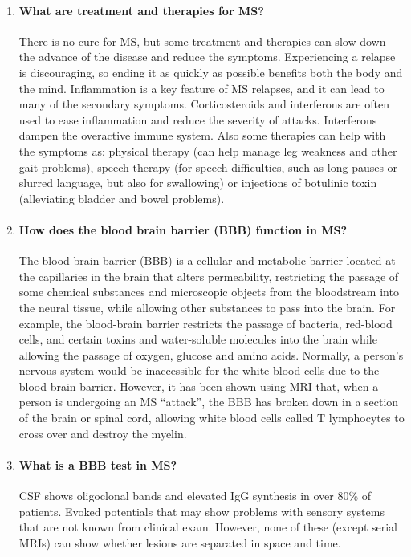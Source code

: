 \documentclass[12pt,article,oneside,a4paper]{memoir}
\begin{document}
\begin{enumerate}
\item \paragraph{What are treatment and therapies for MS?}
There is no cure for MS, but some treatment and therapies can slow down the
advance of the disease and reduce the symptoms.
Experiencing a relapse is discouraging, so ending it as quickly as possible
benefits both the body and the mind. Inflammation is a key feature of MS
relapses, and it can lead to many of the secondary symptoms. Corticosteroids
and interferons are often used to ease inflammation and reduce the severity of
attacks. Interferons dampen the overactive immune system. Also some therapies
can help with the symptoms as: physical therapy (can help manage leg weakness
and other gait problems), speech therapy (for speech difficulties, such as long
pauses or slurred language, but also for swallowing) or injections of botulinic
toxin (alleviating bladder and bowel problems).

\item \paragraph{How does the blood brain barrier (BBB) function in MS?}
The blood-brain barrier (BBB) is a cellular and metabolic barrier located at
the capillaries in the brain that alters permeability, restricting the passage
of some chemical substances and microscopic objects from the bloodstream into
the neural tissue, while allowing other substances to pass into the brain. For
example, the blood-brain barrier restricts the passage of bacteria, red-blood
cells, and certain toxins and water-soluble molecules into the brain while
allowing the passage of oxygen, glucose and amino acids. Normally, a person's
nervous system would be inaccessible for the white blood cells due to the
blood-brain barrier. However, it has been shown using MRI that, when a person
is undergoing an MS ``attack'', the BBB has broken down in a section of the
brain or spinal cord, allowing white blood cells called T lymphocytes to cross
over and destroy the myelin. 

\item \paragraph{What is a BBB test in MS?}
CSF shows oligoclonal bands and elevated IgG synthesis in over 80\% of patients.
Evoked potentials that may show problems with sensory systems that are not
known from clinical exam. However, none of these (except serial MRIs) can show
whether lesions are separated in space and time.


\end{enumerate}
\end{document}
